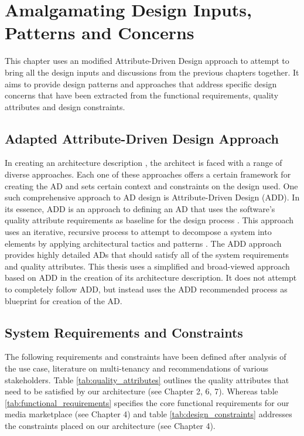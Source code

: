 \chapter{Amalgamating Design Inputs, Patterns and Concerns}
This chapter uses an modified Attribute-Driven Design approach to attempt to bring all the design inputs and discussions from the previous chapters together. It aims to provide  design patterns and approaches that address specific design concerns  that have been extracted from the functional requirements,  quality attributes and design constraints.

\section{Adapted Attribute-Driven Design Approach}
 \label{sec:add} 
In creating an architecture description , the architect is faced with a range of diverse approaches. Each one of these approaches offers a certain framework for creating the AD and sets certain context and constraints on the design used. One such comprehensive approach to AD design is Attribute-Driven Design (ADD). In its essence, ADD is an approach to defining an AD that uses the software's quality attribute requirements as baseline for the design process \cite{Wojcik2006}. This approach uses an iterative, recursive process to attempt to decompose a system into elements by applying architectural tactics and patterns \cite{Wojcik2006}. The ADD approach provides highly detailed ADs that should satisfy all of the system requirements and quality attributes. This thesis uses a simplified and broad-viewed approach based on ADD in the creation of its architecture description. It does not attempt to completely follow ADD, but instead uses the ADD recommended process as blueprint for creation of the AD.

\section{System Requirements and Constraints}
\label{sec:reqandconstraints}
The following requirements and constraints have been defined after analysis of the use case, literature on multi-tenancy and recommendations of various stakeholders. Table \ref{tab:quality_attributes} outlines the quality attributes that need to be satisfied by our architecture (see Chapter 2, 6, 7). Whereas table \ref{tab:functional_requirements} specifies the core functional requirements for our media marketplace  (see Chapter 4) and table \ref{tab:design_constraints} addresses the constraints placed on our architecture  (see Chapter 4). 


